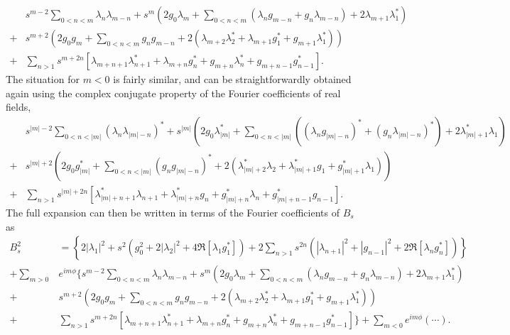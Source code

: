 \documentclass[a4paper, 11pt]{article}
\begin{document}
\begin{equation}
\begin{aligned}
    &s^{m-2} \sum_{0<n<m} \lambda_n \lambda_{m-n} + s^m \left(2g_0 \lambda_m + \sum_{0<n<m} (\lambda_n g_{m-n} + g_n \lambda_{m-n}) + 2 \lambda_{m+1} \lambda_1^*\right) \\ 
    +& s^{m+2} \left(2g_0 g_m + \sum_{0 < n < m} g_n g_{m-n} + 2 \left(\lambda_{m+2} \lambda_2^* + \lambda_{m+1} g_1^* + g_{m+1} \lambda_1^*\right) \right) \\
    +& \sum_{n > 1} s^{m+2n} \left[\lambda_{m+n+1} \lambda_{n+1}^* + \lambda_{m+n} g_n^* + g_{m+n} \lambda_n^* + g_{m+n-1} g_{n-1}^*\right].
\end{aligned}
\end{equation}
The situation for $m < 0$ is fairly similar, and can be straightforwardly obtained again using the complex conjugate property of the Fourier coefficients of real fields,
\begin{equation}
    \begin{aligned}
        &s^{|m|-2} \sum_{0<n<|m|} (\lambda_n \lambda_{|m|-n})^* + s^{|m|} \left(2g_0 \lambda_{|m|}^* + \sum_{0<n<|m|} ((\lambda_n g_{|m|-n})^* + (g_n \lambda_{|m|-n})^*) + 2 \lambda_{|m|+1}^* \lambda_1\right) \\ 
        +& s^{|m|+2} \left(2g_0 g_{|m|}^* + \sum_{0 < n < |m|} (g_n g_{|m|-n})^* + 2 \left(\lambda_{|m|+2}^* \lambda_2 + \lambda_{|m|+1}^* g_1 + g_{|m|+1}^* \lambda_1\right) \right) \\
        +& \sum_{n > 1} s^{|m|+2n} \left[\lambda_{|m|+n+1}^* \lambda_{n+1} + \lambda_{|m|+n}^* g_n + g_{|m|+n}^* \lambda_n + g_{|m|+n-1}^* g_{n-1}\right].
    \end{aligned}
\end{equation}
The full expansion can then be written in terms of the Fourier coefficients of $B_s$ as
\begin{equation}
\begin{aligned}
    B_s^2 &= \left\{2|\lambda_1|^2 + s^2\left(g_0^2 + 2|\lambda_2|^2 + 4 \Re[\lambda_1 g_1^*]\right) + 2\sum_{n>1} s^{2n} \left(|\lambda_{n+1}|^2 + |g_{n-1}|^2 + 2 \Re[\lambda_n g_n^*]\right)\right\} \\
    + \sum_{m>0} &e^{im\phi} \Bigg\{s^{m-2} \sum_{0<n<m} \lambda_n \lambda_{m-n} + s^m \left(2g_0 \lambda_m + \sum_{0<n<m} (\lambda_n g_{m-n} + g_n \lambda_{m-n}) + 2 \lambda_{m+1} \lambda_1^* \right) \\ 
    +& s^{m+2} \left(2g_0 g_m + \sum_{0 < n < m} g_n g_{m-n} + 2 \left(\lambda_{m+2} \lambda_2^* + \lambda_{m+1} g_1^* + g_{m+1} \lambda_1^*\right) \right) \\
    +& \sum_{n > 1} s^{m+2n} \left[\lambda_{m+n+1} \lambda_{n+1}^* + \lambda_{m+n} g_n^* + g_{m+n} \lambda_n^* + g_{m+n-1} g_{n-1}^* \right]\Bigg\} + \sum_{m<0} e^{im\phi} \left(\cdots\right).
\end{aligned}
\end{equation}
\end{document}
